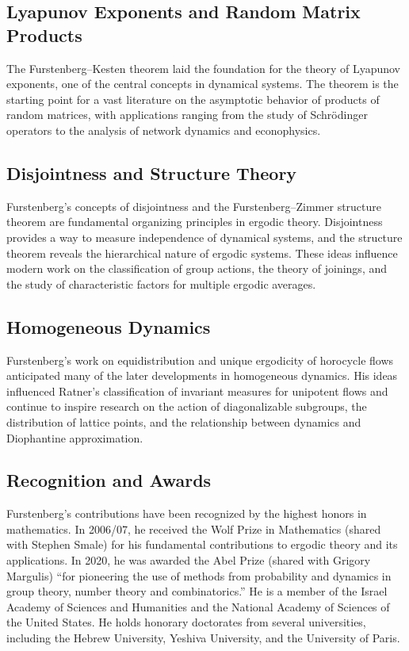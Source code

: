 \subsection{Lyapunov Exponents and Random Matrix Products}

The Furstenberg--Kesten theorem laid the foundation for the theory of Lyapunov exponents, one of the central concepts in dynamical systems. The theorem is the starting point for a vast literature on the asymptotic behavior of products of random matrices, with applications ranging from the study of Schr\"odinger operators to the analysis of network dynamics and econophysics.

\subsection{Disjointness and Structure Theory}

Furstenberg's concepts of disjointness and the Furstenberg--Zimmer structure theorem are fundamental organizing principles in ergodic theory. Disjointness provides a way to measure independence of dynamical systems, and the structure theorem reveals the hierarchical nature of ergodic systems. These ideas influence modern work on the classification of group actions, the theory of joinings, and the study of characteristic factors for multiple ergodic averages.

\subsection{Homogeneous Dynamics}

Furstenberg's work on equidistribution and unique ergodicity of horocycle flows anticipated many of the later developments in homogeneous dynamics. His ideas influenced Ratner's classification of invariant measures for unipotent flows and continue to inspire research on the action of diagonalizable subgroups, the distribution of lattice points, and the relationship between dynamics and Diophantine approximation.

\subsection{Recognition and Awards}

Furstenberg's contributions have been recognized by the highest honors in mathematics. In 2006/07, he received the Wolf Prize in Mathematics (shared with Stephen Smale) for his fundamental contributions to ergodic theory and its applications. In 2020, he was awarded the Abel Prize (shared with Grigory Margulis) ``for pioneering the use of methods from probability and dynamics in group theory, number theory and combinatorics.'' He is a member of the Israel Academy of Sciences and Humanities and the National Academy of Sciences of the United States. He holds honorary doctorates from several universities, including the Hebrew University, Yeshiva University, and the University of Paris.

